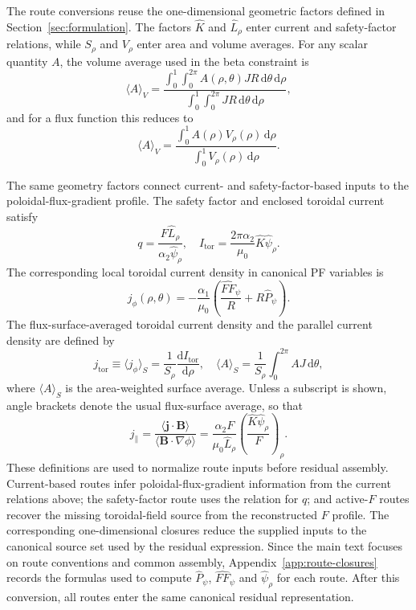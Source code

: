 \documentclass[final, 3p, times]{elsarticle}
\begin{document}
The route conversions reuse the one-dimensional geometric factors defined in Section~\ref{sec:formulation}. The factors $\hat{K}$ and $\hat{L}_\rho$ enter current and safety-factor relations, while $S_\rho$ and $V_\rho$ enter area and volume averages. For any scalar quantity $A$, the volume average used in the beta constraint is
\begin{equation}
    \langle A\rangle_V
    =\frac{\displaystyle\int_0^1\!\int_0^{2\pi}A(\rho,\theta)JR\,\mathrm{d}\theta\,\mathrm{d}\rho}
    {\displaystyle\int_0^1\!\int_0^{2\pi}JR\,\mathrm{d}\theta\,\mathrm{d}\rho},
\end{equation}
and for a flux function this reduces to
\begin{equation}
    \langle A\rangle_V
    =\frac{\displaystyle\int_0^1 A(\rho)V_\rho(\rho)\,\mathrm{d}\rho}
    {\displaystyle\int_0^1 V_\rho(\rho)\,\mathrm{d}\rho} .
\end{equation}

The same geometry factors connect current- and safety-factor-based inputs to the poloidal-flux-gradient profile. The safety factor and enclosed toroidal current satisfy
\begin{equation}
    q=\frac{F\hat{L}_\rho}{\alpha_2\hat{\psi}_\rho},
    \quad
    I_{\mathrm{tor}}=\frac{2\pi\alpha_2}{\mu_0}\hat{K}\hat{\psi}_\rho .
\end{equation}
The corresponding local toroidal current density in canonical PF variables is
\begin{equation}
    j_\phi(\rho,\theta)
    =-\frac{\alpha_1}{\mu_0}
    \left(\frac{\hat{FF}_\psi}{R}+R\hat{P}_\psi\right).
\end{equation}
The flux-surface-averaged toroidal current density and the parallel current density are defined by
\begin{equation}
    j_{\mathrm{tor}}\equiv\langle j_\phi\rangle_S
    =\frac{1}{S_\rho}\frac{\mathrm{d}I_{\mathrm{tor}}}{\mathrm{d}\rho},
    \quad
    \langle A\rangle_S=\frac{1}{S_\rho}\int_0^{2\pi}AJ\,\mathrm{d}\theta,
\end{equation}
where $\langle A\rangle_S$ is the area-weighted surface average. Unless a subscript is shown, angle brackets denote the usual flux-surface average, so that
\begin{equation}
    j_{\parallel}
    =\frac{\langle\mathbf{j}\cdot\mathbf{B}\rangle}{\langle\mathbf{B}\cdot\nabla\phi\rangle}
    =\frac{\alpha_2 F}{\mu_0\hat{L}_\rho}
    \left(\frac{\hat{K}\hat{\psi}_\rho}{F}\right)_\rho .
\end{equation}
These definitions are used to normalize route inputs before residual assembly. Current-based routes infer poloidal-flux-gradient information from the current relations above; the safety-factor route uses the relation for $q$; and active-$F$ routes recover the missing toroidal-field source from the reconstructed $F$ profile. The corresponding one-dimensional closures reduce the supplied inputs to the canonical source set used by the residual expression. Since the main text focuses on route conventions and common assembly, Appendix~\ref{app:route-closures} records the formulas used to compute $\hat{P}_\psi$, $\hat{FF}_\psi$ and $\hat{\psi}_\rho$ for each route. After this conversion, all routes enter the same canonical residual representation.
\end{document}
